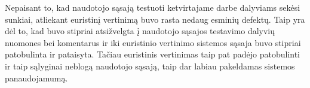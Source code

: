 Nepaisant to, kad naudotojo sąsają testuoti ketvirtajame darbe dalyviams sekėsi
sunkiai, atliekant euristinį vertinimą buvo rasta nedaug esminių defektų.
Taip yra dėl to, kad buvo stipriai atsižvelgta į naudotojo sąsajos testavimo
dalyvių nuomones bei komentarus ir iki euristinio vertinimo sistemos sąsaja buvo
stipriai patobulinta ir pataisyta. Tačiau euristinis vertinimas taip pat padėjo
patobulinti ir taip sąlyginai neblogą naudotojo sąsają, taip dar labiau
pakeldamas sistemos panaudojamumą. 
